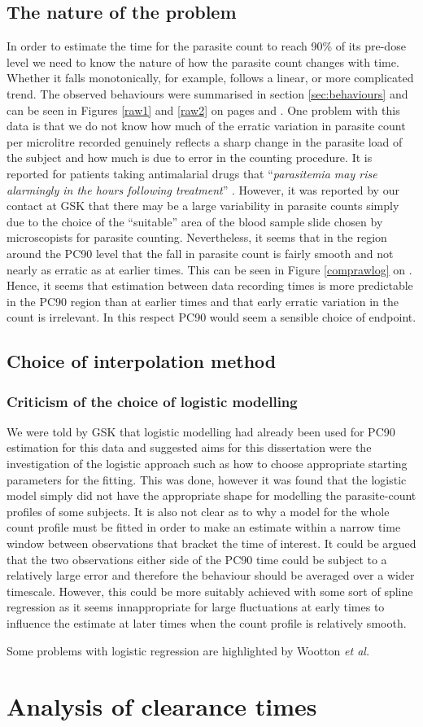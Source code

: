 \subsection{The nature of the problem}
In order to estimate the time for the parasite count to reach 90\% of its pre-dose level we need to know the nature of how the parasite count changes with time. Whether it falls monotonically, for example, follows a linear, or more complicated trend. The observed behaviours were summarised in section \ref{sec:behaviours} and can be seen in Figures \ref{raw1} and \ref{raw2} on pages \pageref{raw1} and \pageref{raw2}. One problem with this data is that we do not know how much of the erratic variation in parasite count per microlitre recorded genuinely reflects a sharp change in the parasite load of the subject and how much is due to error in the counting procedure. It is reported for patients taking antimalarial drugs that ``\textit{parasitemia may rise alarmingly in the hours following treatment}'' \cite{white}. However, it was reported by our contact at GSK that there may be a large variability in parasite counts simply due to the choice of the ``suitable'' area of the blood sample slide chosen by microscopists for parasite counting. Nevertheless, it seems that in the region around the PC90 level that the fall in parasite count is fairly smooth and not nearly as erratic as at earlier times. This can be seen in Figure \ref{comprawlog} on \pageref{comprawlog}. Hence, it seems that estimation between data recording times is more predictable in the PC90 region than at earlier times and that early erratic variation in the count is irrelevant. In this respect PC90 would seem a sensible choice of endpoint.
\subsection{Choice of interpolation method}
\subsubsection*{Criticism of the choice of logistic modelling}
We were told by GSK that logistic modelling had already been used for PC90 estimation for this data and suggested aims for this dissertation were the investigation of the logistic approach such as how to choose appropriate starting parameters for the fitting. This was done, however it was found that the logistic model simply did not have the appropriate shape for modelling the parasite-count profiles of some subjects. It is also not clear as to why a model for the whole count profile must be fitted in order to make an estimate within a narrow time window between observations that bracket the time of interest. It could be argued that the two observations either side of the PC90 time could be subject to a relatively large error and therefore the behaviour should be averaged over a wider timescale. However, this could be more suitably achieved with some sort of spline regression as it seems innappropriate for large fluctuations at early times to influence the estimate at later times when the count profile is relatively smooth.

Some problems with logistic regression are highlighted by Wootton {\it et al.}  

\section{Analysis of clearance times}